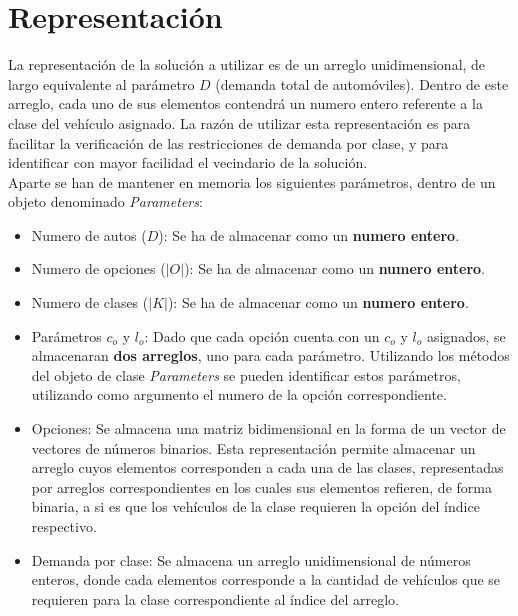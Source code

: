 \documentclass[letter, 10pt]{article}
\begin{document}
\section{Representación}
La representación de la solución a utilizar es de un arreglo unidimensional, de largo equivalente al parámetro $D$ (demanda total de automóviles). Dentro de este arreglo, cada uno de sus elementos contendrá un numero entero referente a la clase del vehículo asignado. La razón de utilizar esta representación es para facilitar la verificación de las restricciones de demanda por clase, y para identificar con mayor facilidad el vecindario de la solución.\\
Aparte se han de mantener en memoria los siguientes parámetros, dentro de un objeto denominado \textit{Parameters}:
\begin{itemize}
    \item Numero de autos ($D$): Se ha de almacenar como un \textbf{numero entero}.
    \item Numero de opciones ($|O|$): Se ha de almacenar como un \textbf{numero entero}.
    \item Numero de clases ($|K|$): Se ha de almacenar como un \textbf{numero entero}.
    \item Parámetros $c_o$ y $l_o$: Dado que cada opción cuenta con un $c_o$ y $l_o$ asignados, se almacenaran \textbf{dos arreglos}, uno para cada parámetro. Utilizando los métodos del objeto de clase \textit{Parameters} se pueden identificar estos parámetros, utilizando como argumento el numero de la opción correspondiente.
    \item Opciones: Se almacena una matriz bidimensional en la forma de un vector de vectores de números binarios. Esta representación permite almacenar un arreglo cuyos elementos corresponden a cada una de las clases, representadas por arreglos correspondientes en los cuales sus elementos refieren, de forma binaria, a si es que los vehículos de la clase requieren la opción del índice respectivo.
    \item Demanda por clase: Se almacena un arreglo unidimensional de números enteros, donde cada elementos corresponde a la cantidad de vehículos que se requieren para la clase correspondiente al índice del arreglo.
\end{itemize}
\end{document}
